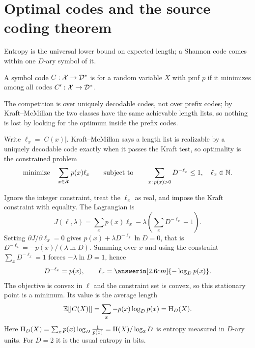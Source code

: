 \section{Optimal codes and the source coding theorem}\label{sec:optimal-codes}
\quad{}

\begin{strand}
Entropy is the universal lower bound on expected length; a Shannon code comes
within one $D$-ary symbol of it.
\end{strand}



\begin{definition}\label{def:optimal-code}
A symbol code $C:\mathcal{X}\to\mathcal{D}^*$ is  for a random variable $X$ with
pmf $p$ if it minimizes \answerin[2.8cm]{$\E[|C(X)|]$} among all
 codes $C':\mathcal{X}\to\mathcal{D}^*$.
\end{definition}

The competition is over uniquely decodable codes, not over prefix codes; by
Kraft--McMillan the two classes have the same achievable length lists, so
nothing is lost by looking for the optimum inside the prefix codes.


Write $\ell_x=|C(x)|$. Kraft--McMillan says a length list is realizable by a
uniquely decodable code exactly when it passes the Kraft test, so optimality is
the constrained problem
\[
  \text{minimize}\quad \sum_{x\in\mathcal{X}}p(x)\ell_x
  \qquad\text{subject to}\qquad
  \sum_{x:\,p(x)>0}D^{-\ell_x}\le1,
  \quad \ell_x\in\mathbb{N}.
\]


Ignore the integer constraint, treat the $\ell_x$ as real, and impose the Kraft
constraint with equality. The Lagrangian is
\[
  J(\ell,\lambda)=\sum_xp(x)\ell_x
  -\lambda\left(\sum_xD^{-\ell_x}-1\right).
\]
Setting $\partial J/\partial\ell_x=0$ gives
$p(x)+\lambda D^{-\ell_x}\ln D=0$, that is
$D^{-\ell_x}=-p(x)/(\lambda\ln D)$. Summing over $x$ and using the constraint
$\sum_xD^{-\ell_x}=1$ forces $-\lambda\ln D=1$, hence
\[
  D^{-\ell_x}=p(x),
  \qquad
  \ell_x=\answerin[2.6cm]{-\log_Dp(x)}.
\]
The objective is convex in $\ell$ and the constraint set is convex, so this
stationary point is a minimum. Its value is the average length
\[
  \mathbb{E}[|C(X)|]=\sum_x-p(x)\log_Dp(x)=\mathrm{H}_D(X).
\]
Here $\mathrm{H}_D(X)=\sum_xp(x)\log_D\frac1{p(x)}=\mathrm{H}(X)/\log_2D$ is entropy
measured in $D$-ary units. For $D=2$ it is the usual entropy in bits.

